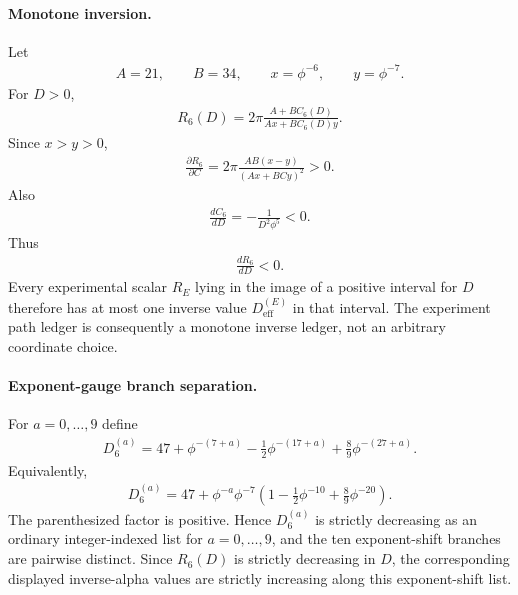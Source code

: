 \paragraph{Monotone inversion.}
Let
$$
\begin{aligned}
A=21,\qquad B=34,\qquad x=\phi^{-6},\qquad y=\phi^{-7}.
\end{aligned}
$$
For $D>0$,
$$
\begin{aligned}
R_6(D)=2\pi\frac{A+BC_6(D)}{Ax+BC_6(D)y}.
\end{aligned}
$$
Since $x>y>0$,
$$
\begin{aligned}
\frac{\partial R_6}{\partial C}
=
2\pi\frac{AB(x-y)}{(Ax+BCy)^2}
>0.
\end{aligned}
$$
Also
$$
\begin{aligned}
\frac{dC_6}{dD}=-\frac{1}{D^2\phi^5}<0.
\end{aligned}
$$
Thus
$$
\begin{aligned}
\frac{dR_6}{dD}<0.
\end{aligned}
$$
Every experimental scalar $R_E$ lying in the image of a positive interval for $D$ therefore has at most one inverse value $D_{\mathrm{eff}}^{(E)}$ in that interval.  The experiment path ledger is consequently a monotone inverse ledger, not an arbitrary coordinate choice.

\paragraph{Exponent-gauge branch separation.}
For $a=0,\ldots,9$ define
$$
\begin{aligned}
D_6^{(a)}
=
47+\phi^{-(7+a)}
-\frac{1}{2}\phi^{-(17+a)}
+\frac{8}{9}\phi^{-(27+a)}.
\end{aligned}
$$
Equivalently,
$$
\begin{aligned}
D_6^{(a)}=47+\phi^{-a}\phi^{-7}
\left(1-\frac{1}{2}\phi^{-10}+\frac{8}{9}\phi^{-20}\right).
\end{aligned}
$$
The parenthesized factor is positive.  Hence $D_6^{(a)}$ is strictly decreasing as an ordinary integer-indexed list for $a=0,\ldots,9$, and the ten exponent-shift branches are pairwise distinct.  Since $R_6(D)$ is strictly decreasing in $D$, the corresponding displayed inverse-alpha values are strictly increasing along this exponent-shift list.

